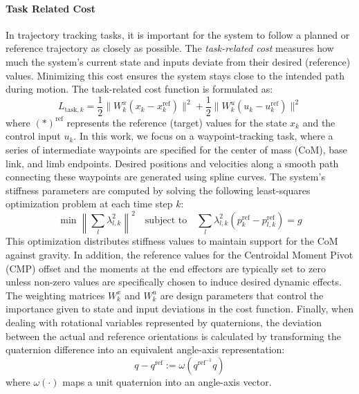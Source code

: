 \documentclass[main.tex]{subfiles}
\begin{document}
\paragraph{Task Related Cost}
In trajectory tracking tasks, it is important for the system to follow a planned or reference trajectory as closely as possible. The \textit{task-related cost} measures how much the system's current state and inputs deviate from their desired (reference) values. Minimizing this cost ensures the system stays close to the intended path during motion.
The task-related cost function is formulated as:
\begin{equation}
L_{\text{task},k} = \frac{1}{2} \| W^x_k (x_k - x^{\text{ref}}_k) \|^2 + \frac{1}{2} \| W^u_k (u_k - u^{\text{ref}}_k) \|^2
\end{equation}
where $(\ast)^{\text{ref}}$ represents the reference (target) values for the state $x_k$ and the control input $u_k$.
In this work, we focus on a waypoint-tracking task, where a series of intermediate waypoints are specified for the center of mass (CoM), base link, and limb endpoints. Desired positions and velocities along a smooth path connecting these waypoints are generated using spline curves.
The system's stiffness parameters are computed by solving the following least-squares optimization problem at each time step $k$:
\begin{equation}
\min \left\| \sum_l \lambda_{l,k}^2 \right\|^2 \quad \text{subject to} \quad \sum_l \lambda_{l,k}^2 (p^{\text{ref}}_k - p^{\text{ref}}_{l,k}) = g
\end{equation}
This optimization distributes stiffness values to maintain support for the CoM against gravity.
In addition, the reference values for the Centroidal Moment Pivot (CMP) offset and the moments at the end effectors are typically set to zero unless non-zero values are specifically chosen to induce desired dynamic effects.
The weighting matrices $W^x_k$ and $W^u_k$ are design parameters that control the importance given to state and input deviations in the cost function.
Finally, when dealing with rotational variables represented by quaternions, the deviation between the actual and reference orientations is calculated by transforming the quaternion difference into an equivalent angle-axis representation:
\begin{equation}
q - q^{\text{ref}} := \omega(q^{\text{ref}^{-1}} q)
\end{equation}
where $\omega(\cdot)$ maps a unit quaternion into an angle-axis vector.
\end{document}
